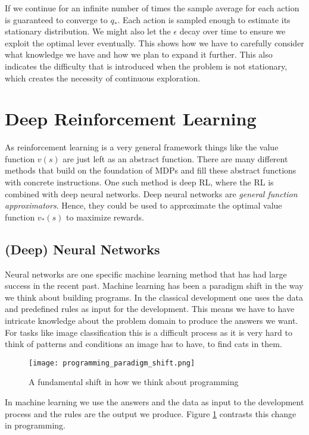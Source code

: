 If we continue for an infinite number of times the sample average for each action is guaranteed to converge to $ q_{*} $. Each action is sampled enough to estimate its stationary distribution. We might also let the $ \epsilon $ decay over time to ensure we exploit the optimal lever eventually. This shows how we have to carefully consider what knowledge we have and how we plan to expand it further. This also indicates the difficulty that is introduced when the problem is not stationary, which creates the necessity of continuous exploration.

\section{Deep Reinforcement Learning}
As reinforcement learning is a very general framework things like the value function $ v(s)$ are just left as an abstract function. There are many different methods that build on the foundation of MDPs and fill these abstract functions with concrete instructions. One such method is deep RL, where the RL is combined with deep neural networks. Deep neural networks are \textit{general function approximators}. Hence, they could be used to approximate the optimal value function $ v_{*}(s) $ to maximize rewards.

\subsection{(Deep) Neural Networks}
\label{neural_networks}

Neural networks are one specific machine learning method that has had large success in the recent past. Machine learning has been a paradigm shift in the way we think about building programs. In the classical development one uses the data and predefined rules as input for the development. This means we have to have intricate knowledge about the problem domain to produce the answers we want. For tasks like image classification this is a difficult process as it is very hard to think of patterns and conditions an image has to have, to find cats in them.

\begin{figure}
    \centering
    \texttt{[image: programming\_paradigm\_shift.png]}
    \caption{A fundamental shift in how we think about programming \cite[cf. p. 5f.]{moroney_ai_2020}}
    \label{programming_paradigm_shift}
\end{figure}

In machine learning we use the answers and the data as input to the development process and the rules are the output we produce. Figure \ref{programming_paradigm_shift} contrasts this change in programming.

